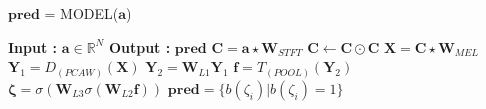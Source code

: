 \begin{algorithm}
  \caption{$\textbf{pred}$ = MODEL($\textbf{a}$) }\label{Temporal Pooling}
  \begin{algorithmic}[1]
    \Statex \textbf{Input :} $\textbf{a} \in \mathbb{R}^{N}$
    \Statex \textbf{Output :} $\textbf{pred}$  
    \State $\textbf{C} = \textbf{a} \star \textbf{W}_{STFT}$ 
    \State $\textbf{C} \leftarrow \textbf{C} \odot \textbf{C}$ 
    \State $\textbf{X} = \textbf{C} \star \textbf{W}_{MEL}$ 
    \State $\textbf{Y}_{1} = D_{(PCAW)}(\textbf{X})$ 
    \State $\textbf{Y}_{2} = \textbf{W}_{L1}\textbf{Y}_{1}$  
    \State $\textbf{f} = T_{(POOL)}(\textbf{Y}_{2})$ 
    \State $\bm{\zeta} = \sigma(\textbf{W}_{L3}\sigma(\textbf{W}_{L2}\textbf{f}))$ 
    \State $\textbf{pred} = \{ b(\zeta_{i}) | b(\zeta_{i}) = 1 \}$ 
  \end{algorithmic}
\end{algorithm}
\FloatBarrier
\bigskip

